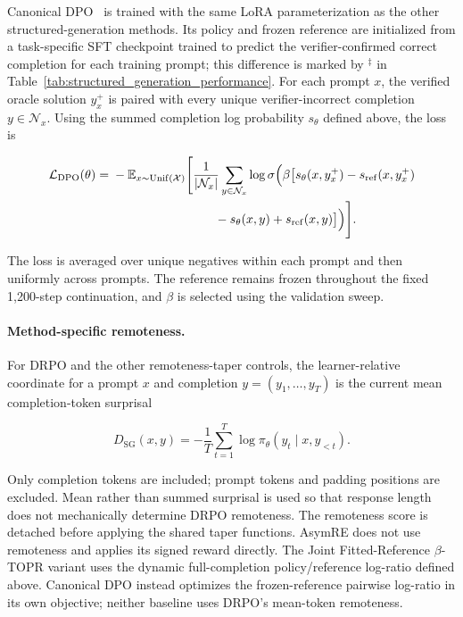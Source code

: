 \documentclass{article}
\theoremstyle{plain}
\theoremstyle{definition}
\theoremstyle{remark}
\begin{document}
Canonical DPO~\citep{rafailov2023direct} is trained with the same LoRA
parameterization as the other structured-generation methods. Its policy and
frozen reference are initialized from a task-specific SFT checkpoint trained
to predict the verifier-confirmed correct completion for each training prompt;
this difference is marked by \(^{\ddagger}\) in
Table~\ref{tab:structured_generation_performance}.
For each prompt \(x\), the verified oracle solution
\(y_x^+\) is paired with every unique verifier-incorrect completion
\(y\in\mathcal N_x\). Using the summed completion log probability
\(s_\theta\) defined above, the loss is

\[
\begin{aligned}
\mathcal L_{\mathrm{DPO}}(\theta)
={}&-
\mathbb E_{x\sim\operatorname{Unif}(\mathcal X)}
\Bigg[
\frac{1}{|\mathcal N_x|}
\sum_{y\in\mathcal N_x}
\log\sigma\Bigl(
\beta\bigl[
 s_\theta(x,y_x^+)-s_{\mathrm{ref}}(x,y_x^+) \\
&\hspace{8.2em}
-s_\theta(x,y)+s_{\mathrm{ref}}(x,y)
\bigr]
\Bigr)
\Bigg].
\end{aligned}
\]

The loss is averaged over unique negatives within each prompt and then
uniformly across prompts. The reference remains frozen throughout the
fixed 1,200-step continuation, and \(\beta\) is selected using the
validation sweep.

\paragraph{Method-specific remoteness.}

For DRPO and the other remoteness-taper controls, the learner-relative
coordinate for a prompt \(x\) and completion
\(y=(y_1,\ldots,y_T)\) is the current mean completion-token surprisal

\[
D_{\mathrm{SG}}(x,y)
=
-\frac{1}{T}
\sum_{t=1}^{T}
\log
\pi_\theta
\left(
y_t\mid x,y_{<t}
\right).
\]

Only completion tokens are included; prompt tokens and padding positions
are excluded. Mean rather than summed surprisal is used so that response
length does not mechanically determine DRPO remoteness. The remoteness
score is detached before applying the shared taper functions. AsymRE
does not use remoteness and applies its signed reward directly. The
Joint Fitted-Reference \(\beta\)-TOPR variant uses the dynamic
full-completion policy/reference log-ratio defined above. Canonical DPO
instead optimizes the frozen-reference pairwise log-ratio in its own
objective; neither baseline uses DRPO's mean-token remoteness.
\end{document}
